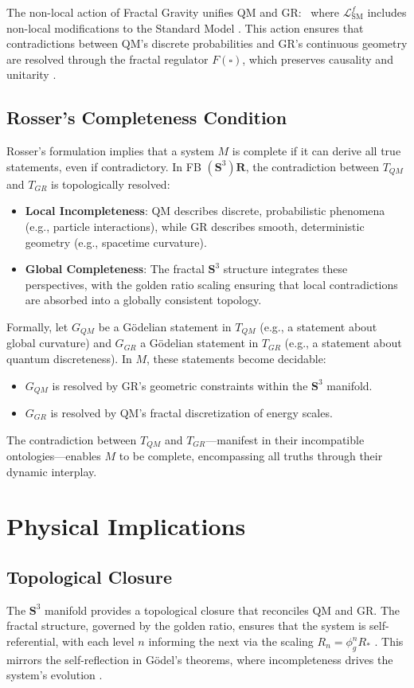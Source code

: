 \documentclass[a4paper,12pt]{article}
\begin{document}
The non-local action of Fractal Gravity unifies QM and GR:
\,
\]
where $\mathscr{L}_{\text{SM}}^f$ includes non-local modifications to the Standard Model \cite{Preece2025b}. This action ensures that contradictions between QM's discrete probabilities and GR's continuous geometry are resolved through the fractal regulator $F(\square)$, which preserves causality and unitarity \cite{Preece2025b}.

\subsection{Rosser's Completeness Condition}
Rosser's formulation implies that a system $M$ is complete if it can derive all true statements, even if contradictory. In FB $\left(\mathbf{S}^3\right)\mathbf{R}$, the contradiction between $T_{QM}$ and $T_{GR}$ is topologically resolved:
\begin{itemize}
    \item \textbf{Local Incompleteness}: QM describes discrete, probabilistic phenomena (e.g., particle interactions), while GR describes smooth, deterministic geometry (e.g., spacetime curvature).
    \item \textbf{Global Completeness}: The fractal $\mathbf{S}^3$ structure integrates these perspectives, with the golden ratio scaling ensuring that local contradictions are absorbed into a globally consistent topology.
\end{itemize}
Formally, let $G_{QM}$ be a Gödelian statement in $T_{QM}$ (e.g., a statement about global curvature) and $G_{GR}$ a Gödelian statement in $T_{GR}$ (e.g., a statement about quantum discreteness). In $M$, these statements become decidable:
\begin{itemize}
    \item $G_{QM}$ is resolved by GR's geometric constraints within the $\mathbf{S}^3$ manifold.
    \item $G_{GR}$ is resolved by QM's fractal discretization of energy scales.
\end{itemize}
The contradiction between $T_{QM}$ and $T_{GR}$---manifest in their incompatible ontologies---enables $M$ to be complete, encompassing all truths through their dynamic interplay.

\section{Physical Implications}

\subsection{Topological Closure}
The $\mathbf{S}^3$ manifold provides a topological closure that reconciles QM and GR. The fractal structure, governed by the golden ratio, ensures that the system is self-referential, with each level $n$ informing the next via the scaling $R_n = \phi_g^n R_*$ \cite{Preece2025a}. This mirrors the self-reflection in Gödel's theorems, where incompleteness drives the system's evolution \cite{Preece2025a}.
\end{document}

